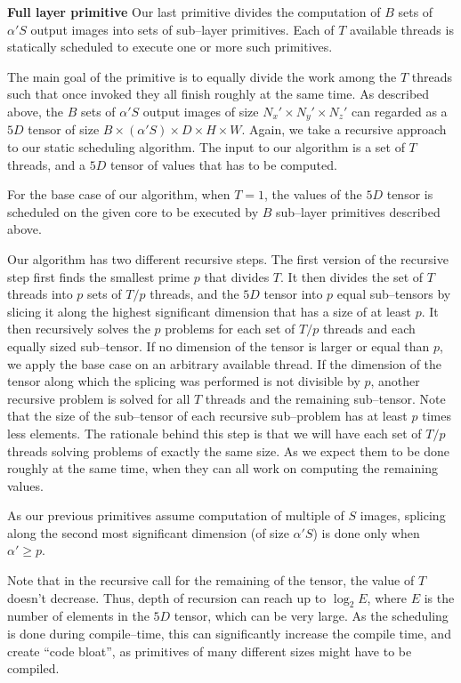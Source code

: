   {\bf Full layer primitive} \quad Our last primitive divides the
  computation of $B$ sets of $\alpha' S$ output images into sets of
  sub--layer primitives.  Each of $T$ available threads is statically
  scheduled to execute one or more such primitives.

  The main goal of the primitive is to equally divide the work among
  the $T$ threads such that once invoked they all finish roughly at
  the same time.  As described above, the $B$ sets of $\alpha'S$
  output images of size $N_x' \times N_y' \times N_z'$ can regarded as
  a $5D$ tensor of size $B \times (\alpha'S) \times D \times H \times
  W$.  Again, we take a recursive approach to our static scheduling
  algorithm.  The input to our algorithm is a set of $T$ threads, and
  a $5D$ tensor of values that has to be computed.

  For the base case of our algorithm, when $T=1$, the values of the
  $5D$ tensor is scheduled on the given core to be executed by $B$
  sub--layer primitives described above.

  Our algorithm has two different recursive steps.  The first version
  of the recursive step first finds the smallest prime $p$ that
  divides $T$.  It then divides the set of $T$ threads into $p$ sets
  of $T/p$ threads, and the $5D$ tensor into $p$ equal sub--tensors by
  slicing it along the highest significant dimension that has a size
  of at least $p$.  It then recursively solves the $p$ problems for
  each set of $T/p$ threads and each equally sized sub--tensor.  If no
  dimension of the tensor is larger or equal than $p$, we apply the
  base case on an arbitrary available thread.  If the dimension of the
  tensor along which the splicing was performed is not divisible by
  $p$, another recursive problem is solved for all $T$ threads and the
  remaining sub--tensor.  Note that the size of the sub--tensor of
  each recursive sub--problem has at least $p$ times less elements.
  The rationale behind this step is that we will have each set of
  $T/p$ threads solving problems of exactly the same size.  As we
  expect them to be done roughly at the same time, when they can all
  work on computing the remaining values.

  As our previous primitives assume computation of multiple of $S$
  images, splicing along the second most significant dimension (of
  size $\alpha'S$) is done only when $\alpha' \ge p$.

  Note that in the recursive call for the remaining of the tensor, the
  value of $T$ doesn't decrease.  Thus, depth of recursion can reach
  up to $\log_2 E$, where $E$ is the number of elements in the $5D$
  tensor, which can be very large.  As the scheduling is done during
  compile--time, this can significantly increase the compile time, and
  create ``code bloat'', as primitives of many different sizes might
  have to be compiled.

